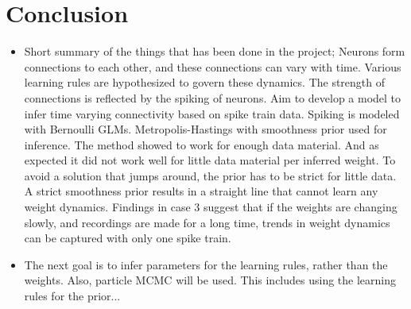 \section{Conclusion}

\begin{itemize}
    \item Short summary of the things that has been done in the project; Neurons form connections to each other, and these connections can vary with time. Various learning rules are hypothesized to govern these dynamics. The strength of connections is reflected by the spiking of neurons. Aim to develop a model to infer time varying connectivity based on spike train data. Spiking is modeled with Bernoulli GLMs. Metropolis-Hastings with smoothness prior used for inference. The method showed to work for enough data material. And as expected it did not work well for little data material per inferred weight. To avoid a solution that jumps around, the prior has to be strict for little data. A strict smoothness prior results in a straight line that cannot learn any weight dynamics. Findings in case 3 suggest that if the weights are changing slowly, and recordings are made for a long time, trends in weight dynamics can be captured with only one spike train.
    \item The next goal is to infer parameters for the learning rules, rather than the weights. Also, particle MCMC will be used. This includes using the learning rules for the prior... 
\end{itemize}



\cleardoublepage